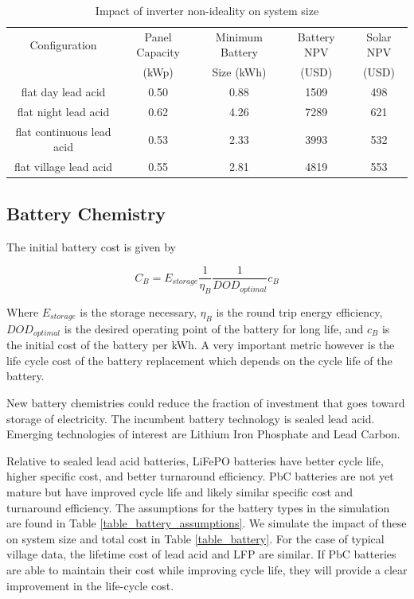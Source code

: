 \documentclass[conference]{IEEEtran}
\begin{document}
\begin{table}
\centering
\begin{tabular}{c c c c c}
Configuration & Panel Capacity & Minimum Battery & Battery NPV & Solar NPV \\
              & (kWp)          & Size (kWh)      & (USD)       & (USD)     \\
\hline
flat day lead acid             & 0.50 & 0.88 & 1509 & 498 \\
flat night lead acid           & 0.62 & 4.26 & 7289 & 621 \\
flat continuous lead acid      & 0.53 & 2.33 & 3993 & 532 \\
flat village lead acid         & 0.55 & 2.81 & 4819 & 553 \\
\end{tabular}
\caption{Impact of inverter non-ideality on system size}
\label{table_inverter}
\end{table}

\subsection{Battery Chemistry}

The initial battery cost is given by

$$ C_B = E_{storage} \frac{1}{\eta_B} \frac{1}{DOD_{optimal}} c_B $$

Where $E_{storage}$ is the storage necessary, $\eta_B$ is the
round trip energy efficiency, $DOD_{optimal}$ is the desired
operating point of the battery for long life, and $c_B$ is the
initial cost of the battery per kWh.
A very important metric however is the life cycle cost of the 
battery replacement which depends on the cycle life of the battery.

New battery chemistries could reduce the fraction of investment
that goes toward storage of electricity.
The incumbent battery technology is sealed lead acid.
Emerging technologies of interest are Lithium Iron Phosphate
and Lead Carbon.

Relative to sealed lead acid batteries, LiFePO batteries 
have better cycle life, higher specific cost, and better
turnaround efficiency.
PbC batteries are not yet mature but have improved cycle
life and likely similar specific cost and turnaround
efficiency.
The assumptions for the battery types in the simulation
are found in Table \ref{table_battery_assumptions}.
We simulate the impact of these on system size and total cost
in Table \ref{table_battery}.
For the case of typical village data, the lifetime cost of 
lead acid and LFP are similar.
If PbC batteries are able to maintain their cost while
improving cycle life, they will provide a clear improvement
in the life-cycle cost.
\end{document}
